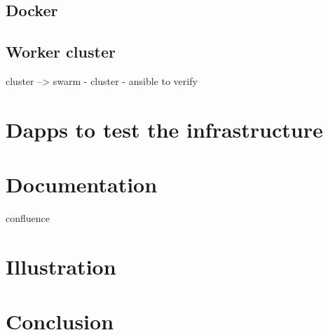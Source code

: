    \subsection{Docker}

    \subsection{Worker cluster}
    cluster --> swarm - cluster - ansible to verify

\section{Dapps to test the infrastructure}

\section{Documentation}
    confluence

\section{Illustration}

\section{Conclusion}

